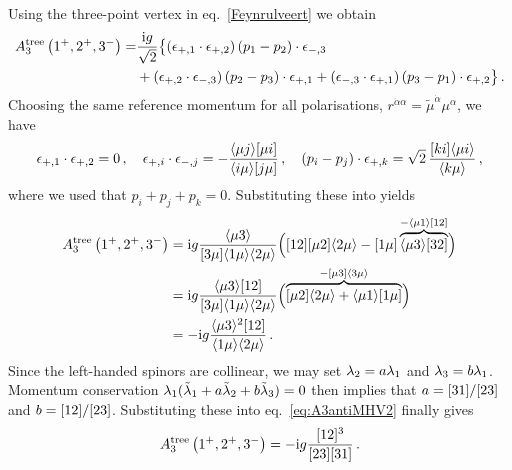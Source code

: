 Using the three-point vertex in eq.~\eqref{Feynrulveert} we obtain
%
\begin{align} \label{eq:A3antiMHV1}
\begin{aligned}
A_3^{\text{tree}}\left(1^+, 2^+, 3^-\right) = & \frac{\mathrm{i} g}{\sqrt{2}} \bigl\{ (\epsilon_{+,1}\cdot \epsilon_{+,2})\, (p_1-p_2)\cdot \epsilon_{-,3} \\
& + (\epsilon_{+,2}\cdot \epsilon_{-,3}) \, (p_2-p_3) \cdot \epsilon_{+,1} +
(\epsilon_{-,3}\cdot \epsilon_{+,1})\, (p_3-p_1) \cdot \epsilon_{+,2} \bigr\} \,.
\end{aligned}
\end{align}
%
Choosing the same reference momentum for all polarisations, $r^{\dot\alpha \alpha} = \tilde{\mu}^{\dot\alpha} \mu^{\alpha}$, we have
\begin{align}
\epsilon_{+,1} \cdot \epsilon_{+,2} = 0 \,, \quad
\epsilon_{+,i} \cdot \epsilon_{-,j} = - \frac{\langle\mu j\rangle[\mu i]}{\langle i \mu\rangle[j\mu]}\, ,
\quad (p_{i}-p_{j})\cdot\epsilon_{+,k}= \sqrt{2}\, \frac{[ki]\langle\mu i\rangle}{\langle k\mu\rangle}\,,
\end{align}
where we used that $p_i+p_j+p_k=0$.
%
Substituting these into  yields
\begin{align} \label{eq:A3antiMHV2}
\begin{aligned}
A_3^{\text{tree}}\left(1^+, 2^+, 3^-\right) & = \mathrm{i} g \frac{ \langle \mu 3 \rangle }{[3\mu] \langle 1 \mu \rangle \langle 2 \mu \rangle } \Bigl( [12][\mu2]\langle 2 \mu \rangle - [1\mu]  \overbrace{ \langle \mu 3 \rangle[32] }^{-\langle \mu 1 \rangle[12] }\Bigr) \\
& = \mathrm{i} g \frac{ \langle \mu 3 \rangle [12] }{[3\mu] \langle 1 \mu \rangle \langle 2 \mu \rangle } \Bigl(  \overbrace{ [\mu2]\langle 2 \mu \rangle + \langle \mu 1 \rangle [1\mu]}^{-[\mu3]\langle 3 \mu \rangle} \Bigr) \\
& =  -\mathrm{i} g \frac{\langle\mu 3\rangle^{2} [12]}{\langle1\mu\rangle\langle2\mu\rangle} \, .
\end{aligned}
\end{align}
Since the left-handed spinors are collinear, we may set $\lambda_{2}=a\lambda_{1}$ and $\lambda_{3}=b\lambda_{1}$.
Momentum conservation $\lambda_{1}(\tilde\lambda_{1} + a\tilde\lambda_{2}+b\tilde\lambda_{3})=0$ then implies that
$a = [31]/[23]$ and $b= [12]/[23]$.
Substituting these into eq.~\eqref{eq:A3antiMHV2} finally gives
\begin{align}
A_3^{\text{tree}}\left(1^+, 2^+, 3^-\right) = -\mathrm{i} g \frac{[12]^{3}}{[23][31]}\, .
\end{align}

\newpage

